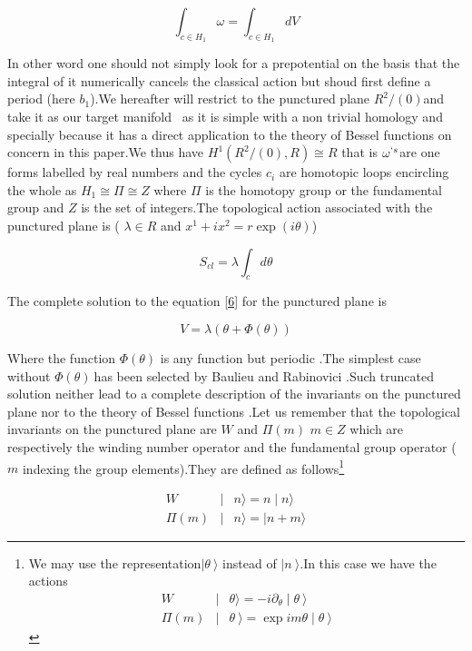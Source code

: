 \documentclass[a4paper,11pt]{article}
\begin{document}
\begin{equation}
\int_{c\in H_{1}}\omega =\int_{c\in H_{1}}dV  \label{6}
\end{equation}

In other word one should not simply look for a prepotential on the basis
that the integral of it numerically cancels the classical action but shoud
first define a period (here $b_{1}$).We hereafter will restrict to the
punctured plane $R^{2}/(0)$and take it as our target manifold \ as it is
simple with a non trivial homology and specially because it has a direct
application to the theory of Bessel functions on concern in this paper.We
thus have $H^{1}(R^{2}/(0),R)\cong R$ that is $\omega ^{`s}$are one forms
labelled by real numbers and the cycles $c_{i}$ are homotopic loops
encircling the whole as $H_{1}\cong \Pi \cong Z$ where $\Pi $ is the
homotopy group or the fundamental group and $Z$ is the set of integers.The
topological action associated with the punctured plane is ( $\lambda \in R$
and $x^{1}+ix^{2}=r\exp (i\theta )$)

\[
S_{cl}=\lambda \int_{c}d\theta 
\]

The complete solution to the equation \ref{6} for the punctured plane is

\begin{equation}
V=\lambda (\theta +\Phi (\theta ))  \label{8}
\end{equation}

Where the function $\Phi (\theta )$ is any function but periodic $.$The
simplest case without $\Phi (\theta )\ $has been selected by Baulieu and
Rabinovici \cite{Chamseddine}.Such truncated solution neither lead to a
complete description of the invariants on the punctured plane nor to the
theory of Bessel functions .Let us remember that the topological invariants
on the punctured plane are $W$ and $\Pi (m)$ $m\in Z$ which are respectively
the winding number operator and the fundamental group operator ( $m$
indexing the group elements).They are defined as follows\footnote{%
We may use the representation$\mid \theta \ \rangle $ instead of $\mid n\
\rangle .$In this case we have the actions $\ $%
\begin{eqnarray*}
W &\mid &\theta \rangle =-i\partial _{\theta }\mid \theta \ \rangle \\
\Pi (m) &\mid &\theta \ \rangle =\exp im\theta \mid \theta \ \rangle
\end{eqnarray*}%
}

\begin{eqnarray*}
W &\mid &n\rangle =n\mid n\rangle \\
\Pi (m) &\mid &n\rangle =\mid n+m\rangle
\end{eqnarray*}
\end{document}
